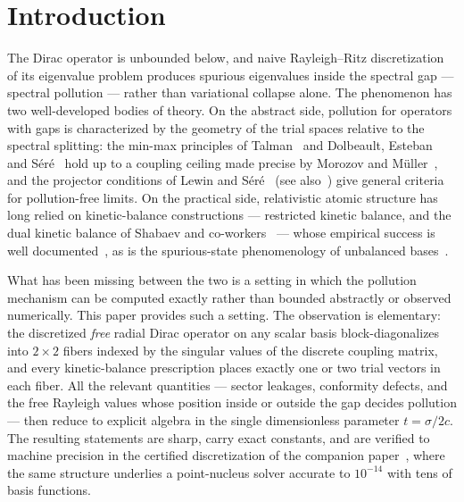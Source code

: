 \documentclass[11pt,reqno]{amsart}
\theoremstyle{definition}
\theoremstyle{remark}
\begin{document}
\maketitle

\section{Introduction}

The Dirac operator is unbounded below, and naive Rayleigh--Ritz
discretization of its eigenvalue problem produces spurious eigenvalues
inside the spectral gap --- spectral pollution --- rather than
variational collapse alone. The phenomenon has two well-developed bodies
of theory. On the abstract side, pollution for operators with gaps is
characterized by the geometry of the trial spaces relative to the
spectral splitting: the min-max principles of Talman~\cite{Talman1986}
and Dolbeault, Esteban and S\'er\'e~\cite{DES2000} hold up to a coupling
ceiling made precise by Morozov and M\"uller~\cite{MorozovMuller2015},
and the projector conditions of Lewin and S\'er\'e~\cite{LewinSere2010}
(see also~\cite{LevitinShargorodsky2004}) give general criteria for
pollution-free limits. On the practical side, relativistic atomic
structure has long relied on kinetic-balance constructions --- restricted
kinetic balance, and the dual kinetic balance of Shabaev and
co-workers~\cite{Shabaev2004} --- whose empirical success is well
documented~\cite{Grant2007,Kutzelnigg1984}, as is the spurious-state
phenomenology of unbalanced bases~\cite{DrakeGoldman1981,Pestka2003,
Tupitsyn2008}.

What has been missing between the two is a setting in which the
pollution mechanism can be computed exactly rather than bounded
abstractly or observed numerically. This paper provides such a setting.
The observation is elementary: the discretized \emph{free} radial Dirac
operator on any scalar basis block-diagonalizes into $2\times2$ fibers
indexed by the singular values of the discrete coupling matrix, and
every kinetic-balance prescription places exactly one or two trial
vectors in each fiber. All the relevant quantities --- sector leakages,
conformity defects, and the free Rayleigh values whose position inside
or outside the gap decides pollution --- then reduce to explicit
algebra in the single dimensionless parameter $t=\sigma/2c$. The
resulting statements are sharp, carry exact constants, and are verified
to machine precision in the certified discretization of the companion
paper~\cite{companion}, where the same structure underlies a
point-nucleus solver accurate to $10^{-14}$ with tens of basis
functions.
\end{document}
